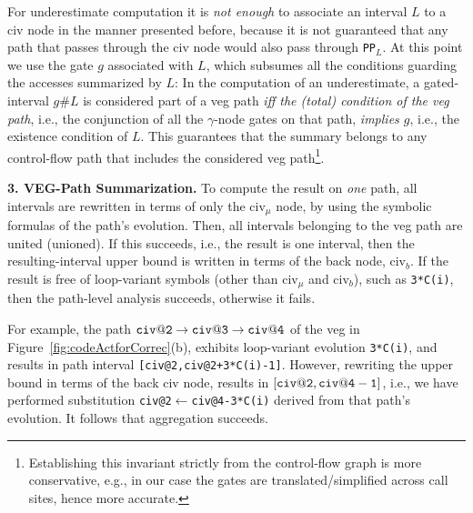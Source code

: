 \documentclass{sig-alternate}
\begin{document}
For underestimate computation it is {\em not enough} to associate an interval $L$ 
to a {\sc civ} node in the manner presented before, because it is not guaranteed
that any path that passes through the {\sc civ} node would also pass through {\tt PP$_L$}.
%
%
At this point we use the gate $g$ associated with $L$, which subsumes all the
conditions guarding the accesses summarized by $L$: 
In the computation of an underestimate, a gated-interval $g\#L$ is considered 
part of a {\sc veg} path {\em iff the (total) condition of the {\sc veg} path}, 
i.e., the conjunction of all the $\gamma$-node gates on that path, {\em implies $g$}, 
i.e., the existence condition of $L$.  This guarantees that the summary belongs
to any control-flow path that includes the considered {\sc veg} path\footnote{
Establishing this invariant strictly from the control-flow graph is more
conservative, e.g., in our case the gates are translated/simplified across call sites,
hence more accurate.
}.


\enlargethispage{\baselineskip}

\vspace{1ex}

{\bf 3. VEG-Path Summarization.} 
%
To compute the result on {\em one} path, all intervals are rewritten in terms of only the
{\sc civ}$_\mu$ node, by using the symbolic formulas of the path's evolution.
Then, all intervals belonging to the {\sc veg} path are united (unioned). 
If this succeeds, i.e., the result is one interval, then the resulting-interval upper 
bound is written in terms of the back node, {\sc civ}$_b$. If the result is free of
loop-variant symbols (other than {\sc civ}$_\mu$ and  {\sc civ}$_b$), such as {\tt 3*C(i)},
then the path-level analysis succeeds, otherwise it fails.

For example, the path ${\tt civ@2}\rightarrow{\tt civ@3}\rightarrow{\tt civ@4}$ 
of the {\sc veg} in Figure~\ref{fig:codeActforCorrec}(b), exhibits loop-variant evolution 
{\tt 3*C(i)}, and results in path interval {\tt [civ@2,civ@2+3*C(i)-1]}. 
%
However, rewriting the upper bound in terms of the back %
{\sc civ} node, results in $[{\tt civ@2},{\tt civ@4-1}]$,
i.e., we have performed substitution {\tt civ@2$\leftarrow$civ@4-3*C(i)}
derived from that path's evolution.
It follows that aggregation succeeds.
%
\end{document}
